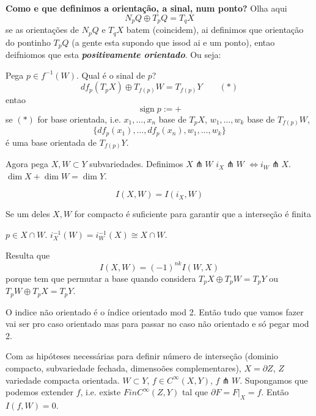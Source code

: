 \textbf{Como e que definimos a orientação, a sinal, num ponto?} Olha aqui
\[N_pQ \oplus  T_p Q= T_qX\]
se as orientações de \(N_pQ\) e \(T_qX\) batem (coincidem), ai definimos que orientação do pontinho \(T_pQ\) (a gente esta supondo que issod ai e um ponto), entao deifniomos que esta  \textit{\textbf{positivamente orientado}}. Ou seja:

\begin{defn}\leavevmode
Pega \(p \in f^{-1}(W)\). Qual é o sinal de \(p\)?
 \[df_p(T_pX) \oplus  T_{f(p)}W = T_{f(p)}Y\qquad (*)\]
entao
\[\operatorname{sign}p:=+\]
se \((*)\) for base orientada, i.e. \(x_1,\ldots,x_n\) base de \(T_pX\), \(w_1,\ldots,w_k\) base de \(T_{f(p)}W\),
\[\{df_p(x_1),\ldots,df_p(x_n),w_1,\ldots,w_k\}\]
é uma base orientada de \(T_{f(p)}Y\).

\begin{defn}\leavevmode
Agora pega \(X, W \subset Y\) subvariedades. Definimos \(X \pitchfork W\) \(i_X \pitchfork  W\) \(\iff i_W \pitchfork  X\). \(\dim X + \dim W= \dim Y\).

\[I(X,W) = I(i_X,W)\]

\begin{remark}\leavevmode
Se um deles \(X,W\) for compacto é suficiente para garantir que a interseção é finita
\end{remark}

\(p \in X \cap W\). \(i_X^{-1}(W)=i^{-1}_W(X)\cong X \cap W\).

Resulta que 
\[I(X,W)= (-1)^{nk}I(W,X)\]
porque tem que permutar a base quando considera \(T_pX \oplus  T_pW = T_pY\) ou \(T_pW \oplus  T_pX= T_pY\).
\end{defn}

\end{defn}

\begin{remark}\leavevmode
O indice não orientado é o índice orientado mod 2. Então tudo que vamos fazer vai ser pro caso orientado mas para passar no caso não orientado e só pegar mod 2.
\end{remark}

\begin{prop}\leavevmode
	Com as hipóteses necessárias para definir número de interseção (dominio compacto, subvariedade fechada, dimensoões complementares), \(X = \partial  Z\), \(Z\) variedade compacta orientada. \(W \subset Y\), \(f \in C^\infty (X,Y)\), \(f \pitchfork  W\). Supongamos que podemos extender \(f\), i.e. existe \(F in C^\infty (Z,Y)\) tal que \(\partial F=F |_{ X}=f\). Então \(I(f,W)=0\).
\end{prop}

